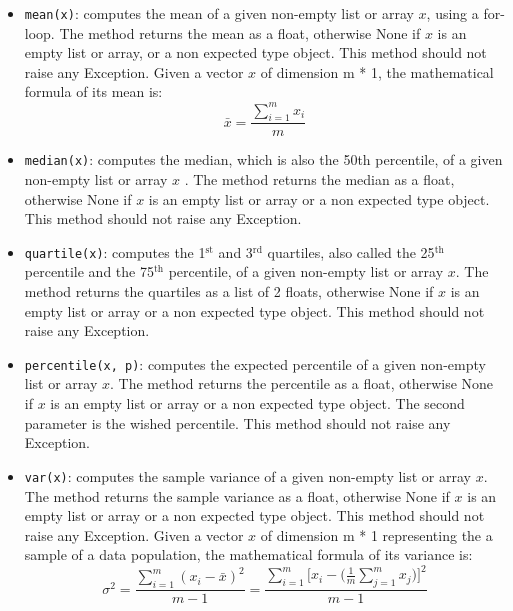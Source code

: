 \documentclass{42-en}
\begin{document}
\begin{itemize}
  \item \texttt{mean(x)}: computes the mean of a given non-empty list or array $x$, using a for-loop.
        The method returns the mean as a float, otherwise None if $x$ is an empty list or array,
        or a non expected type object.
        This method should not raise any Exception.
        \newline
        Given a vector $x$ of dimension m * 1, the mathematical formula of its mean is:
        $$
        \bar{x} = \frac{\sum_{i = 1}^{m}{x_i}}{m}
        $$

  \item \texttt{median(x)}: computes the median, which is also the 50th percentile, of a given non-empty list or array $x$ .
        The method returns the median as a float,
        otherwise None if $x$ is an empty list or array or a non expected type object.
        This method should not raise any Exception.

  \item \texttt{quartile(x)}: computes the 1$^\text{st}$ and 3$^\text{rd}$ quartiles,
        also called the 25$^\text{th}$ percentile and the 75$^\text{th}$ percentile, of a given non-empty list or array $x$.
        The method returns the quartiles as a list of 2 floats,
        otherwise None if $x$ is an empty list or array or a non expected type object.
        This method should not raise any Exception.

  \item \texttt{percentile(x, p)}: computes the expected percentile of a given non-empty list or array $x$.
        The method returns the percentile as a float,
        otherwise None if $x$ is an empty list or array or a non expected type object.
        The second parameter is the wished percentile.
        This method should not raise any Exception.

  \item \texttt{var(x)}: computes the sample variance of a given non-empty list or array $x$.
        The method returns the sample variance as a float,
        otherwise None if $x$ is an empty list or array or a non expected type object.
        This method should not raise any Exception.
        \newline
        Given a vector $x$ of dimension m * 1 representing the a sample of a data population, the mathematical formula of its variance is:
        $$
        \sigma^2 = \frac{\sum_{i = 1}^{m}{(x_i - \bar{x})^2}}{m - 1} = \frac{\sum_{i = 1}^{m}{[x_i - (\frac{1}{m}\sum_{j = 1}^{m}{x_j}})]^2}{m - 1}
        $$


\end{itemize}
\end{document}
